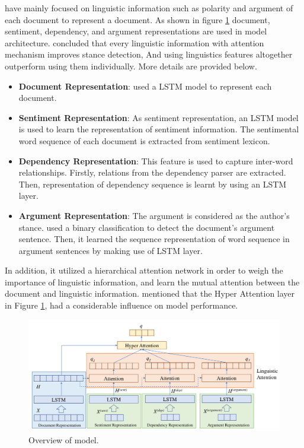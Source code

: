 \cite{Hierarchical-Attention-Network} have mainly focused on linguistic information such as polarity and argument of each document to represent a document. As shown in figure \ref{fig:hierarchical_att} document, sentiment, dependency, and argument representations are used in model architecture. \cite{Hierarchical-Attention-Network} concluded that every linguistic information with attention mechanism improves stance detection, And using linguistics features altogether outperform using them individually. More details are provided below.

\begin{itemize}
	\item \textbf{Document Representation}: \cite{Hierarchical-Attention-Network} used a LSTM model to represent each document.
	\item \textbf{Sentiment Representation}: As sentiment representation, an LSTM model is used to learn the representation of sentiment information. The sentimental word sequence of each document is extracted from sentiment lexicon. 
	\item \textbf{Dependency Representation}: This feature is used to capture inter-word relationships. Firstly, relations from the dependency parser are extracted. Then, representation of dependency sequence is learnt by using an LSTM layer.
	\item \textbf{Argument Representation}: The argument is considered as the author's stance. \cite{Hierarchical-Attention-Network} used a binary classification to detect the document's argument sentence. Then, it learned the sequence representation of word sequence in argument sentences by making use of LSTM layer.
\end{itemize}

In addition, it utilized a hierarchical attention network in order to weigh the importance of linguistic information, and learn the mutual attention between the document and linguistic information. \cite{Hierarchical-Attention-Network} mentioned that the Hyper Attention layer in Figure \ref{fig:hierarchical_att}, had a considerable influence on model performance. 

\begin{figure}
	\centering
	\includegraphics[scale=0.4]{statistics/stance/hierarchial-attention-network.png}
	\caption{Overview of \cite{Hierarchical-Attention-Network} model.}
	\label{fig:hierarchical_att}
\end{figure}

